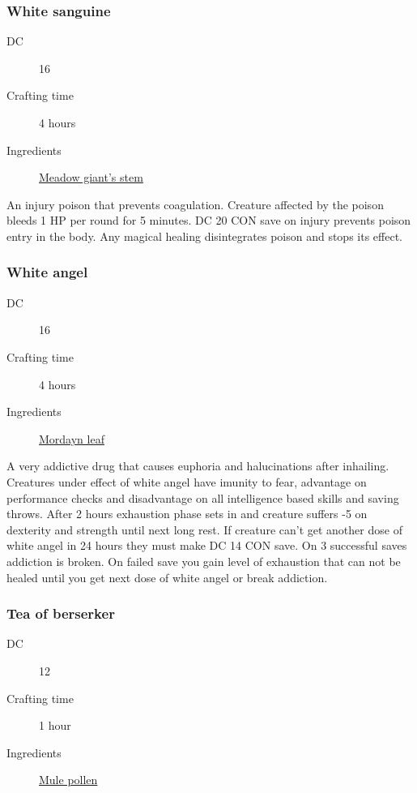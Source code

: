 \subsubsection{White sanguine}
\label{White sanguine}

\begin{description}
\item [DC] 16
\item [Crafting time] 4 hours
\item [Ingredients] \hyperref[Meadow Giant]{Meadow giant's stem}
\end{description}

An injury poison that prevents coagulation. Creature affected by the poison bleeds 
1 HP per round for 5 minutes. DC 20 CON save on injury prevents poison entry in the body. 
Any magical healing disintegrates poison and stops its effect.

\subsubsection{White angel}
\label{White angel}

\begin{description}
\item [DC] 16
\item [Crafting time] 4 hours
\item [Ingredients] \hyperref[Mordayn]{Mordayn leaf}
\end{description}

A very addictive drug that causes euphoria and halucinations after inhailing. 
Creatures under effect of white angel have imunity to fear, advantage on performance checks and disadvantage
 on all intelligence based skills and saving throws. 
 After 2 hours exhaustion phase sets in and creature suffers -5 on dexterity and strength 
 until next long rest. If creature can't get another dose of white angel in 24 hours they must make 
 DC 14 CON save. On 3 successful saves addiction is broken. 
 On failed save you gain level of exhaustion that can not be healed until you get next dose 
 of white angel or break addiction.

\subsubsection{Tea of berserker}
\label{Tea of berserker}

\begin{description}
\item [DC] 12
\item [Crafting time] 1 hour
\item [Ingredients] \hyperref[Mule Pollen]{Mule pollen}
\end{description}


